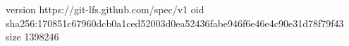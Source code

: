 version https://git-lfs.github.com/spec/v1
oid sha256:170851c67960dcb0a1ced52003d0ea52436fabe946f6e46e4c90e31d78f79f43
size 1398246

